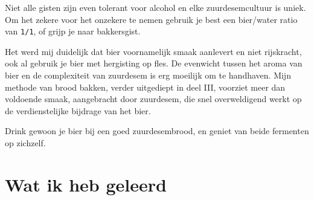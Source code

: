 \documentclass[
  11pt,
  dutch,
]{memoir}
\begin{document}
Niet alle gisten zijn even tolerant voor alcohol en elke
zuurdesemcultuur is uniek. Om het zekere voor het onzekere te nemen
gebruik je best een bier/water ratio van \texttt{1/1}, of grijp je naar
bakkersgist.

Het werd mij duidelijk dat bier voornamelijk smaak aanlevert en niet
rijskracht, ook al gebruik je bier met hergisting op fles. De evenwicht
tussen het aroma van bier en de complexiteit van zuurdesem is erg
moeilijk om te handhaven. Mijn methode van brood bakken, verder
uitgediept in deel III, voorziet meer dan voldoende smaak, aangebracht
door zuurdesem, die snel overweldigend werkt op de verdienstelijke
bijdrage van het bier.

Drink gewoon je bier bij een goed zuurdesembrood, en geniet van beide
fermenten op zichzelf.

\newpage

\hypertarget{wat-ik-heb-geleerd-5}{%
\section{Wat ik heb geleerd}\label{wat-ik-heb-geleerd-5}}
\end{document}
